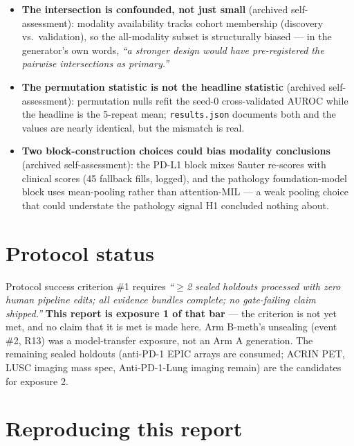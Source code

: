 \documentclass[11pt,a4paper]{article}
\begin{document}
\begin{itemize}[leftmargin=1.2em,itemsep=2pt]
\item \textbf{The intersection is confounded, not just small}
(archived self-assessment): modality availability tracks cohort membership (discovery
vs.\ validation), so the all-modality subset is structurally biased --- in the
generator's own words, \emph{``a stronger design would have pre-registered the pairwise
intersections as primary.''}
\item \textbf{The permutation statistic is not the headline statistic}
(archived self-assessment): permutation nulls refit the seed-0 cross-validated AUROC
while the headline is the 5-repeat mean; \texttt{results.json} documents both and the
values are nearly identical, but the mismatch is real.
\item \textbf{Two block-construction choices could bias modality conclusions}
(archived self-assessment): the PD-L1 block mixes Sauter re-scores with clinical scores
(45 fallback fills, logged), and the pathology foundation-model block uses mean-pooling
rather than attention-MIL --- a weak pooling choice that could understate the pathology
signal H1 concluded nothing about.
\end{itemize}

\section{Protocol status}

Protocol success criterion \#1 requires \emph{``$\geq$2 sealed holdouts processed with zero
human pipeline edits; all evidence bundles complete; no gate-failing claim shipped.''}
\textbf{This report is exposure 1 of that bar} --- the criterion is not yet met, and no claim
that it is met is made here. Arm B-meth's unsealing (event \#2, R13) was a model-transfer
exposure, not an Arm A generation. The remaining sealed holdouts (anti-PD-1 EPIC arrays are
consumed; ACRIN PET, LUSC imaging mass spec, Anti-PD-1-Lung imaging remain) are the candidates
for exposure 2.

\section{Reproducing this report}
\end{document}
